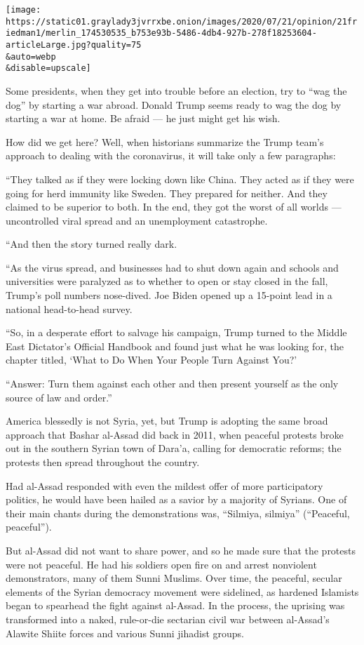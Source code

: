 \texttt{[image: https://static01.graylady3jvrrxbe.onion/images/2020/07/21/opinion/21friedman1/merlin\_174530535\_b753e93b-5486-4db4-927b-278f18253604-articleLarge.jpg?quality=75\\\&auto=webp\\\&disable=upscale]}

Some presidents, when they get into trouble before an election, try to
``wag the dog'' by starting a war abroad. Donald Trump seems ready to
wag the dog by starting a war at home. Be afraid --- he just might get
his wish.

How did we get here? Well, when historians summarize the Trump team's
approach to dealing with the coronavirus, it will take only a few
paragraphs:

``They talked as if they were locking down like China. They acted as if
they were going for herd immunity like Sweden. They prepared for
neither. And they claimed to be superior to both. In the end, they got
the worst of all worlds --- uncontrolled viral spread and an
unemployment catastrophe.

``And then the story turned really dark.

``As the virus spread, and businesses had to shut down again and schools
and universities were paralyzed as to whether to open or stay closed in
the fall, Trump's poll numbers nose-dived. Joe Biden opened up a
15-point lead in a national head-to-head survey.

``So, in a desperate effort to salvage his campaign, Trump turned to the
Middle East Dictator's Official Handbook and found just what he was
looking for, the chapter titled, `What to Do When Your People Turn
Against You?'

``Answer: Turn them against each other and then present yourself as the
only source of law and order.''

America blessedly is not Syria, yet, but Trump is adopting the same
broad approach that Bashar al-Assad did back in 2011, when peaceful
protests broke out in the southern Syrian town of Dara'a, calling for
democratic reforms; the protests then spread throughout the country.

Had al-Assad responded with even the mildest offer of more participatory
politics, he would have been hailed as a savior by a majority of
Syrians. One of their main chants during the demonstrations was,
``Silmiya, silmiya'' (``Peaceful, peaceful'').

But al-Assad did not want to share power, and so he made sure that the
protests were not peaceful. He had his soldiers open fire on and arrest
nonviolent demonstrators, many of them Sunni Muslims. Over time, the
peaceful, secular elements of the Syrian democracy movement were
sidelined, as hardened Islamists began to spearhead the fight against
al-Assad. In the process, the uprising was transformed into a naked,
rule-or-die sectarian civil war between al-Assad's Alawite Shiite forces
and various Sunni jihadist groups.

